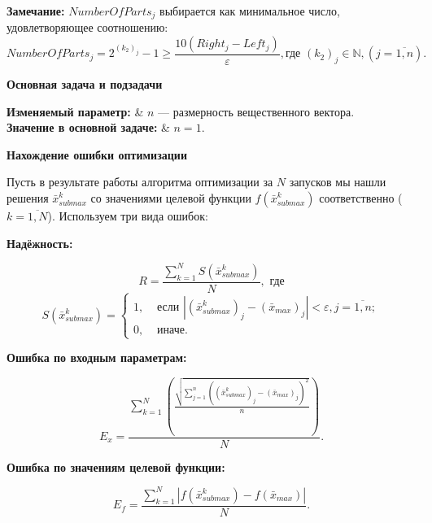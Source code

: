 \documentclass[a4paper,12pt]{article}
\begin{document}
\textbf{Замечание:}  $NumberOfParts_j$ выбирается как минимальное число, удовлетворяющее соотношению:
\begin{equation*}
NumberOfParts_j=2^{\left( k_2\right)_j }-1\geq\dfrac{10\left( Right_j-Left_j\right) }{\varepsilon},\text{где } \left( k_2\right)_j \in \mathbb{N}, \left( j=\overline{1,n}\right).
\end{equation*}

\textbf {Основная задача и подзадачи}

\begin{tabularwide}
\textbf{Изменяемый параметр: } & $n$ --- размерность вещественного вектора. \\
\textbf{Значение в основной задаче:} & $n=1$.\\
\end{tabularwide}

\textbf {Нахождение ошибки оптимизации}

Пусть в результате работы алгоритма оптимизации за $N$ запусков мы нашли решения $\bar{x}_{submax}^k$ со значениями целевой функции $f\left( \bar{x}_{submax}^k\right) $ соответственно ($k=\overline{1,N}$). Используем три вида ошибок:

\textbf{Надёжность: }

\begin{equation*}
R = \dfrac{\sum_{k=1}^{N}S\left( \bar{x}_{submax}^k \right) }{N}, \text{ где}
\end{equation*}
\begin{equation*}
S\left( \bar{x}_{submax}^k \right)=\left\lbrace \begin{aligned} 1,& \text{ если } \left| \left( \bar{x}_{submax}^k \right)_j-\left( \bar{x}_{max} \right)_j\right|<\varepsilon, j=\overline{1,n};   \\ 0,& \text{ иначе}. \end{aligned}\right.
\end{equation*}

\textbf{Ошибка по входным параметрам:}

\begin{equation*}
E_x = \dfrac{\sum_{k=1}^{N} \left( \frac{\sqrt{\sum_{j=1}^{n}{\left( \left( \bar{x}_{submax}^k \right)_j-\left( \bar{x}_{max} \right)_j \right)}^2 }}{n} \right)  }{N}.
\end{equation*}

\textbf{Ошибка по значениям целевой функции: }

\begin{equation*}
E_f = \dfrac{\sum_{k=1}^{N} \left| f\left( \bar{x}_{submax}^k \right)-f\left( \bar{x}_{max} \right) \right|  }{N}.
\end{equation*}
\end{document}
